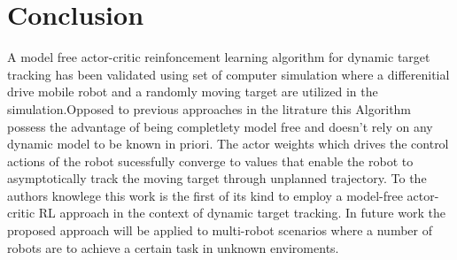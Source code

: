 \documentclass[conference]{IEEEtran}
\begin{document}
    
 



 \section{Conclusion} \label{sec:conclusion}

	A model free actor-critic reinfoncement learning algorithm for dynamic target tracking has been validated using set of computer simulation where a differenitial drive mobile robot and a randomly moving target are utilized in the simulation.Opposed to previous approaches in the litrature this Algorithm possess the advantage of being completlety model free and doesn't rely on any dynamic model to be known in priori. The actor weights which drives the control actions of the robot sucessfully converge to values that enable the robot to asymptotically track the moving target through unplanned trajectory. To the authors knowlege this work is the first of its kind to employ a model-free actor-critic RL approach  in the context of dynamic target tracking. In future work the proposed approach will be applied to multi-robot scenarios where a number of robots are to achieve a certain task in unknown enviroments.          
 


	

\end{document}

